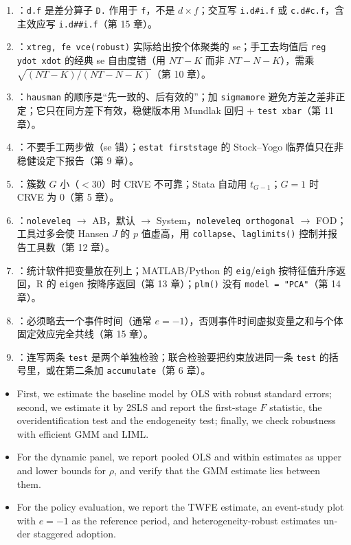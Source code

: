 \begin{enumerate}
  \item {}：\texttt{d.f} 是差分算子 \texttt{D.} 作用于 \texttt{f}，不是 $d\times f$；交互写 \texttt{i.d\#i.f} 或 \texttt{c.d\#c.f}，含主效应写 \texttt{i.d\#\#i.f}（第 15 章）。
  \item {}：\texttt{xtreg, fe vce(robust)} 实际给出按个体聚类的 se；手工去均值后 \texttt{reg ydot xdot} 的经典 se 自由度错（用 $NT-K$ 而非 $NT-N-K$），需乘 $\sqrt{(NT-K)/(NT-N-K)}$（第 10 章）。
  \item {}：\texttt{hausman} 的顺序是“先一致的、后有效的”；加 \texttt{sigmamore} 避免方差之差非正定；它只在同方差下有效，稳健版本用 Mundlak 回归 + \texttt{test xbar}（第 11 章）。
  \item {}：不要手工两步做（se 错）；\texttt{estat firststage} 的 Stock–Yogo 临界值只在非稳健设定下报告（第 9 章）。
  \item {}：簇数 $G$ 小（$<30$）时 CRVE 不可靠；Stata 自动用 $t_{G-1}$；$G=1$ 时 CRVE 为 0（第 5 章）。
  \item {}：\texttt{noleveleq} $\to$ AB，默认 $\to$ System，\texttt{noleveleq orthogonal} $\to$ FOD；工具过多会使 Hansen $J$ 的 $p$ 值虚高，用 \texttt{collapse}、\texttt{laglimits()} 控制并报告工具数（第 12 章）。
  \item {}：统计软件把变量放在列上；MATLAB/Python 的 \texttt{eig}/\texttt{eigh} 按特征值升序返回，R 的 \texttt{eigen} 按降序返回（第 13 章）；\texttt{plm()} 没有 \texttt{model = "PCA"}（第 14 章）。
  \item {}：必须略去一个事件时间（通常 $e=-1$），否则事件时间虚拟变量之和与个体固定效应完全共线（第 15 章）。
  \item {}：连写两条 \texttt{test} 是两个单独检验；联合检验要把约束放进同一条 \texttt{test} 的括号里，或在第二条加 \texttt{accumulate}（第 6 章）。
\end{enumerate}

\begin{english}
\begin{itemize}
  \item First, we estimate the baseline model by OLS with robust standard errors; second, we estimate it by 2SLS and report the first-stage $F$ statistic, the overidentification test and the endogeneity test; finally, we check robustness with efficient GMM and LIML.
  \item For the dynamic panel, we report pooled OLS and within estimates as upper and lower bounds for $\rho$, and verify that the GMM estimate lies between them.
  \item For the policy evaluation, we report the TWFE estimate, an event-study plot with $e=-1$ as the reference period, and heterogeneity-robust estimates under staggered adoption.
\end{itemize}
\end{english}
